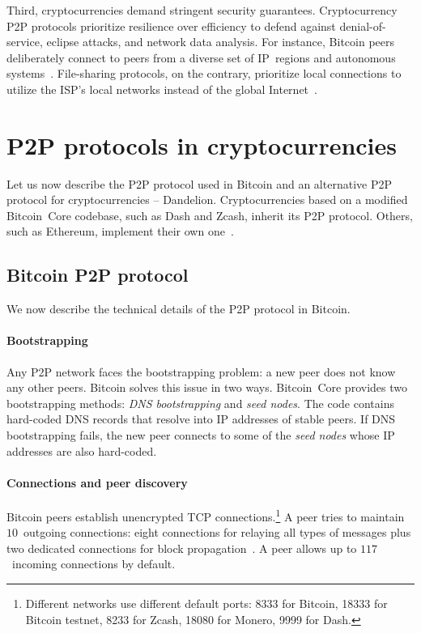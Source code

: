 Third, cryptocurrencies demand stringent security guarantees.
Cryptocurrency P2P protocols prioritize resilience over efficiency to defend against denial-of-service, eclipse attacks, and network data analysis.
For instance, Bitcoin peers deliberately connect to peers from a diverse set of IP~regions and autonomous systems~\cite{Naumenko2019a}.
File-sharing protocols, on the contrary, prioritize local connections to utilize the ISP's local networks instead of the global Internet~\cite{Yoshida2012,Wang2012}.


\section{P2P protocols in cryptocurrencies}

Let us now describe the P2P protocol used in Bitcoin and an alternative P2P protocol for cryptocurrencies -- Dandelion.
Cryptocurrencies based on a modified Bitcoin~Core codebase, such as Dash and Zcash, inherit its P2P protocol.
Others, such as Ethereum, implement their own one~\cite{Henningsen2019}.

\subsection{Bitcoin P2P protocol}
\label{sec:BitcoinP2PProtocol}

We now describe the technical details of the P2P protocol in Bitcoin.

\paragraph{Bootstrapping}

Any P2P network faces the bootstrapping problem: a new peer does not know any other peers.
Bitcoin solves this issue in two ways.
Bitcoin~Core provides two bootstrapping methods: \textit{DNS bootstrapping} and \textit{seed nodes}.
The code contains hard-coded DNS records that resolve into IP addresses of stable peers.
If DNS bootstrapping fails, the new peer connects to some of the \textit{seed nodes} whose IP addresses are also hard-coded.


\paragraph{Connections and peer discovery}

Bitcoin peers establish unencrypted TCP connections.\footnote{Different networks use different default ports: 8333 for Bitcoin, 18333 for Bitcoin testnet, 8233 for Zcash, 18080 for Monero, 9999 for Dash.}
A peer tries to maintain $10$~outgoing connections: eight connections for relaying all types of messages plus two dedicated connections for block propagation~\cite{Daftuar2019}.
A peer allows up to $117$~incoming connections by default.

